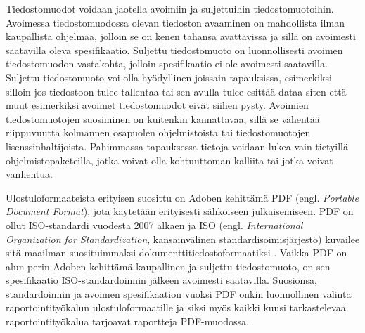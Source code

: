 Tiedostomuodot voidaan jaotella avoimiin ja suljettuihin tiedostomuotoihin. Avoimessa tiedostomuodossa olevan tiedoston avaaminen on mahdollista ilman kaupallista ohjelmaa, jolloin se on kenen tahansa avattavissa ja sillä on avoimesti saatavilla oleva spesifikaatio. \cite{fileformats} Suljettu tiedostomuoto on luonnollisesti avoimen tiedostomuodon vastakohta, jolloin spesifikaatio ei ole avoimesti saatavilla. Suljettu tiedostomuoto voi olla hyödyllinen joissain tapauksissa, esimerkiksi silloin jos tiedostoon tulee tallentaa tai sen avulla tulee esittää dataa siten että muut esimerkiksi avoimet tiedostomuodot eivät siihen pysty. Avoimien tiedostomuotojen suosiminen on kuitenkin kannattavaa, sillä se vähentää riippuvuutta kolmannen osapuolen ohjelmistoista tai tiedostomuotojen lisenssinhaltijoista. Pahimmassa tapauksessa tietoja voidaan lukea vain tietyillä ohjelmistopaketeilla, jotka voivat olla kohtuuttoman kalliita tai jotka voivat vanhentua. \cite{fileformats}

Ulostuloformaateista erityisen suosittu on Adoben kehittämä PDF (engl. \textit{Portable Document Format}), jota käytetään erityisesti sähköiseen julkaisemiseen. PDF on ollut ISO-standardi vuodesta 2007 alkaen ja ISO (engl. \textit{International Organization for Standardization}, kansainvälinen standardisoimisjärjestö) kuvailee sitä maailman suosituimmaksi dokumenttitiedostoformaatiksi \cite{naden_standard_2021}. Vaikka PDF on alun perin Adoben kehittämä kaupallinen ja suljettu tiedostomuoto, on sen spesifikaatio ISO-standardoinnin jälkeen avoimesti saatavilla. Suosionsa, standardoinnin ja avoimen spesifikaation vuoksi PDF onkin luonnollinen valinta raportointityökalun ulostuloformaatille ja siksi myös kaikki kuusi tarkastelevaa raportointityökalua tarjoavat raportteja PDF-muodossa.

